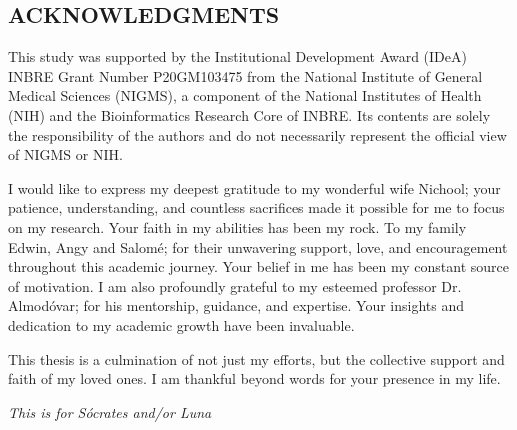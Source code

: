



\vspace*{0.5in}
\begin{center}
\section*{ACKNOWLEDGMENTS}
\end{center}


\noindent
This study was supported by the Institutional Development Award (IDeA) INBRE Grant Number P20GM103475 from the National Institute of General Medical Sciences (NIGMS), a component of the National Institutes of Health (NIH) and the Bioinformatics Research Core of INBRE. Its contents are solely the responsibility of the authors and do not necessarily represent the official view of NIGMS or NIH.

I would like to express my deepest gratitude to my wonderful wife Nichool; your patience, understanding, and countless sacrifices made it possible for me to focus on my research. Your faith in my abilities has been my rock. To my family Edwin, Angy and Salomé; for their unwavering support, love, and encouragement throughout this academic journey. Your belief in me has been my constant source of motivation. I am also profoundly grateful to my esteemed professor Dr. Almodóvar; for his mentorship, guidance, and expertise. Your insights and dedication to my academic growth have been invaluable.

This thesis is a culmination of not just my efforts, but the collective support and faith of my loved ones. I am thankful beyond words for your presence in my life. 


\newpage



\vspace*{2in}
\begin{center}
\emph{This is for Sócrates and/or Luna} %
\end{center}
